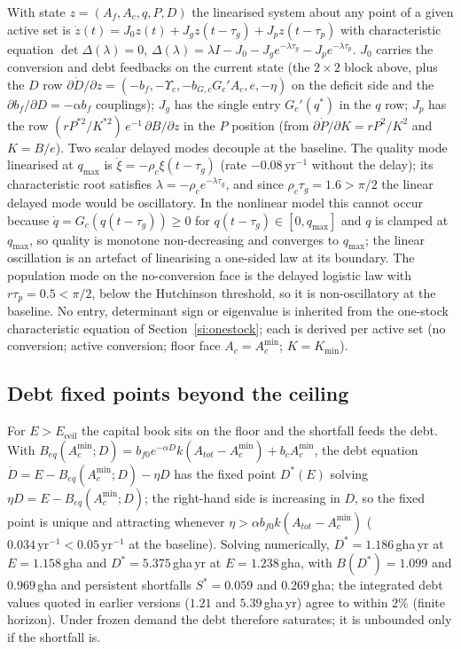 \documentclass[11pt,a4paper]{article}
\newcommand{\Ups}{\Upsilon_c}
\newcommand{\Eceil}{E_{\mathrm{ceil}}}
\newcommand{\Acmin}{A_c^{\min}}
\begin{document}
With state $z=(A_f,A_c,q,P,D)$ the linearised system about any point of a given active set is $\dot z(t)=J_0z(t)+J_gz(t-\tau_g)+J_pz(t-\tau_p)$ with characteristic equation $\det\Delta(\lambda)=0$, $\Delta(\lambda)=\lambda I-J_0-J_ge^{-\lambda\tau_g}-J_pe^{-\lambda\tau_p}$. $J_0$ carries the conversion and debt feedbacks on the current state (the $2\times2$ block above, plus the $D$ row $\partial\dot D/\partial z=(-b_f,-\Ups,-b_{G,c}G_c'A_c,e,-\eta)$ on the deficit side and the $\partial b_f/\partial D=-\alpha b_f$ couplings); $J_g$ has the single entry $G_c'(q^*)$ in the $q$ row; $J_p$ has the row $(rP^{*2}/K^{*2})\,e^{-1}\,\partial B/\partial z$ in the $P$ position (from $\partial\dot P/\partial K=rP^2/K^2$ and $K=B/e$). Two scalar delayed modes decouple at the baseline. The quality mode linearised at $q_{\max}$ is $\dot\xi=-\rho_c\xi(t-\tau_g)$ (rate $-0.08\,\mathrm{yr}^{-1}$ without the delay); its characteristic root satisfies $\lambda=-\rho_ce^{-\lambda\tau_g}$, and since $\rho_c\tau_g=1.6>\pi/2$ the linear delayed mode would be oscillatory. In the nonlinear model this cannot occur because $\dot q=G_c(q(t-\tau_g))\ge0$ for $q(t-\tau_g)\in[0,q_{\max}]$ and $q$ is clamped at $q_{\max}$, so quality is monotone non-decreasing and converges to $q_{\max}$; the linear oscillation is an artefact of linearising a one-sided law at its boundary. The population mode on the no-conversion face is the delayed logistic law with $r\tau_p=0.5<\pi/2$, below the Hutchinson threshold, so it is non-oscillatory at the baseline. No entry, determinant sign or eigenvalue is inherited from the one-stock characteristic equation of Section~\ref{si:onestock}; each is derived per active set (no conversion; active conversion; floor face $A_c=\Acmin$; $K=K_{\min}$).

\subsection{Debt fixed points beyond the ceiling}\label{si:debt}

For $E>\Eceil$ the capital book sits on the floor and the shortfall feeds the debt. With $B_{eq}(\Acmin;D)=b_{f0}e^{-\alpha D}k(A_{tot}-\Acmin)+b_c\Acmin$, the debt equation $\dot D=E-B_{eq}(\Acmin;D)-\eta D$ has the fixed point $D^*(E)$ solving $\eta D=E-B_{eq}(\Acmin;D)$; the right-hand side is increasing in $D$, so the fixed point is unique and attracting whenever $\eta>\alpha b_{f0}k(A_{tot}-\Acmin)$ ($0.034\,\mathrm{yr}^{-1}<0.05\,\mathrm{yr}^{-1}$ at the baseline). Solving numerically, $D^*=1.186$\,gha\,yr at $E=1.158$\,gha and $D^*=5.375$\,gha\,yr at $E=1.238$\,gha, with $B(D^*)=1.099$ and $0.969$\,gha and persistent shortfalls $S^*=0.059$ and $0.269$\,gha; the integrated debt values quoted in earlier versions ($1.21$ and $5.39$\,gha\,yr) agree to within $2\%$ (finite horizon). Under frozen demand the debt therefore saturates; it is unbounded only if the shortfall is.
\end{document}
